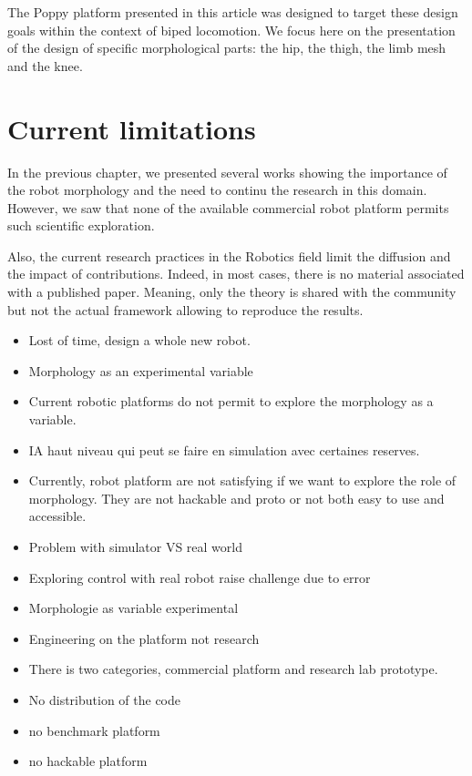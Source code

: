 The Poppy platform presented in this article was designed to target these design goals within the context of biped locomotion.
We focus here on the presentation of the design of specific morphological parts: the hip, the thigh, the limb mesh and the knee.

\section{Current limitations}

In the previous chapter, we presented several works showing the importance of the robot morphology and the need to continu the research in this domain.
However, we saw that none of the available commercial robot platform permits such scientific exploration.

Also, the current research practices in the Robotics field limit the diffusion and the impact of contributions.
Indeed, in most cases, there is no material associated with a published paper.
Meaning, only the theory is shared with the community but not the actual framework allowing to reproduce the results.

\begin{itemize}
    \item Lost of time, design a whole new robot.
    \item Morphology as an experimental variable
    \item Current robotic platforms do not permit to explore the morphology as a variable.
    \item IA haut niveau qui peut se faire en simulation avec certaines reserves.
    \item Currently, robot platform are not satisfying if we want to explore the role of morphology.
    They are not hackable and proto or not both easy to use and accessible.
    \item Problem with simulator VS real world
    \item Exploring control with real robot raise challenge due to error
    \item Morphologie as variable experimental
    \item Engineering on the platform not research
    \item There is two categories, commercial platform and research lab prototype.
    \item No distribution of the code
    \item no benchmark platform
    \item no hackable platform
\end{itemize}

